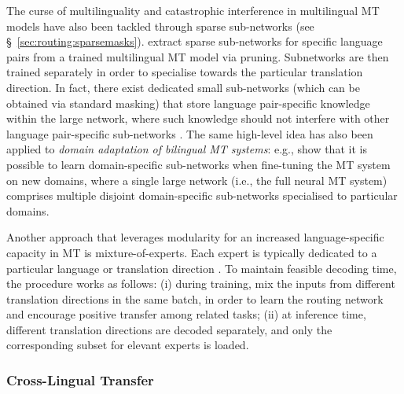 The curse of multilinguality and catastrophic interference in multilingual MT models have also been tackled through sparse sub-networks (see \S~\ref{sec:routing:sparsemasks}). \citet{lin-etal-2021-learning} extract sparse sub-networks for specific language pairs from a trained multilingual MT model via pruning. Subnetworks are then trained separately in order to specialise towards the particular translation direction. In fact, there exist dedicated small sub-networks (which can be obtained via standard masking) that store language pair-specific knowledge within the large network, where such knowledge should not interfere with other language pair-specific sub-networks \citep{dua-etal-2022-tricks}. The same high-level idea has also been applied to \textit{domain adaptation of bilingual MT systems}: e.g., \citet{Liang:2020aaai} show that it is possible to learn domain-specific sub-networks when fine-tuning the MT system on new domains, where a single large network (i.e., the full neural MT system) comprises multiple disjoint domain-specific sub-networks specialised to particular domains.

Another approach that leverages modularity for an increased language-specific capacity in MT is mixture-of-experts. Each expert is typically dedicated to a particular language or translation direction \citep{kudugunta2021beyond,Costa:2022nllb}. To maintain feasible decoding time, the procedure works as follows: (i) during training, mix the inputs from different translation directions in the same batch, in order to learn the routing network and encourage positive transfer among related tasks; (ii) at inference time, different translation directions are decoded separately, and only the corresponding subset for elevant experts is loaded.


\subsubsection{Cross-Lingual Transfer}
\label{sec:xling-transfer}



